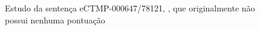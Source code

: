 \begin{figure}[!ht]
\begin{minipage}{.45\textwidth}
    \end{minipage}
    \caption[Estudo de caso CINTIL - Sentença transduzida sem pontuação]{Estudo da sentença eCTMP-000647/78121, , que originalmente não possui nenhuma pontuação}
    \label{fig:ec_cintil_sem_ponto_tree}
\end{figure}